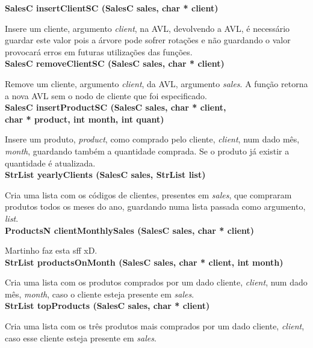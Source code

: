 \documentclass[10pt] {article}
\begin{document}
\noindent \textbf {SalesC insertClientSC (SalesC sales, char * client)}
\par Insere um cliente, argumento \emph{client}, na AVL, devolvendo a AVL, é necessário guardar este valor
pois a árvore pode sofrer rotações e não guardando o valor provocará erros em futuras utilizações das funções. \\

\noindent \textbf {SalesC removeClientSC (SalesC sales, char * client)}
\par Remove um cliente, argumento \emph{client}, da AVL, argumento \emph{sales}. A função retorna a nova AVL 
sem o nodo de cliente que foi especificado. \\

\noindent \textbf {SalesC insertProductSC (SalesC sales, char * client, \\ char * product, int month, int quant)}
\par Insere um produto, \emph{product}, como comprado pelo cliente, \emph{client}, num dado mês, \emph{month}, 
guardando também a quantidade comprada. Se o produto já existir a quantidade é atualizada. \\

\noindent \textbf {StrList yearlyClients (SalesC sales, StrList list)}
\par Cria uma lista com os códigos de clientes, presentes em \emph{sales}, que compraram produtos todos os 
meses do ano, guardando numa lista passada como argumento, \emph{list}. \\

\noindent \textbf {ProductsN clientMonthlySales (SalesC sales, char * client)}
\par Martinho faz esta sff xD. \\

\noindent \textbf {StrList productsOnMonth (SalesC sales, char * client, int month)}
\par Cria uma lista com os produtos comprados por um dado cliente, \emph{client}, num dado mês, \emph{month}, 
caso o cliente esteja presente em \emph{sales}. \\

\noindent \textbf {StrList topProducts (SalesC sales, char * client)}
\par Cria uma lista com os três produtos mais comprados por um dado cliente, \emph{client}, caso esse cliente 
esteja presente em \emph{sales}. \\
\end{document}
